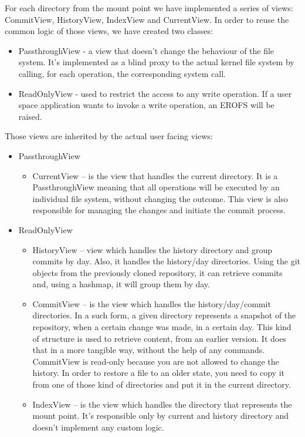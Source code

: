 For each directory from the mount point we have implemented a series of views: CommitView, HistoryView, IndexView and CurrentView. In order to reuse the common logic of those views, we have created two classes:

\begin{itemize}
    \item PassthroughView - a view that doesn't change the behaviour of the file system. It's implemented as a blind proxy to the actual kernel file system by calling, for each operation, the corresponding system call.
    \item ReadOnlyView - used to restrict the access to any write operation. If a user space application wants to invoke a write operation, an EROFS \cite{erofs} will be raised.
\end{itemize}

Those views are inherited by the actual user facing views:
\begin{itemize}
    \item PassthroughView
    \begin{itemize}
        \item CurrentView – is the view that handles the current directory. It is a PassthroughView meaning that all operations will be executed by an individual file system, without changing the outcome. This view is also responsible for managing the changes and initiate the commit process.
    \end{itemize}

    \item ReadOnlyView
    \begin{itemize}
        \item HistoryView – view which handles the history directory and group commits by day. Also, it handles the history/{day} directories. Using the git objects from the previously cloned repository, it can retrieve commits and, using a hashmap, it will group them by day.
        \item CommitView – is the view which handles the history/{day}/{commit} directories. In a such form, a given directory represents a snapshot of the repository, when a certain change was made, in a certain day. This kind of structure is used to retrieve content, from an earlier version. It does that in a more tangible way, without the help of any commands. CommitView is read-only because you are not allowed to change the history. In order to restore a file to an older state, you need to copy it from one of those kind of directories and put it in the current directory.
        \item IndexView – is the view which handles the directory that represents the mount point. It's responsible only by current and history directory and doesn't implement any custom logic.
    \end{itemize}
\end{itemize}

